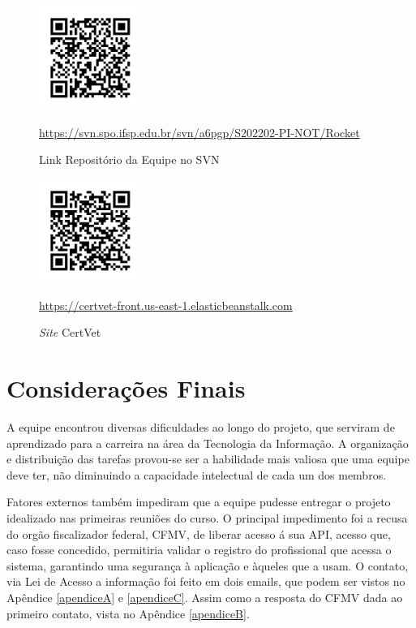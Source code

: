 \documentclass[
    12pt,               %
    openright,          %
    oneside,
    a4paper,            %
    BIBLATEX,           %
    TODO,               %
    english,            %
    brazil              %
    ]{ifsp-spo-inf-ctds}
\begin{document}
    \begin{figure}[htb!]
        \centering
        \includegraphics[width=0.3\textwidth]{qrcode/svn.png}
        \caption{Link Repositório da Equipe no SVN}
        {\footnotesize \url{https://svn.spo.ifsp.edu.br/svn/a6pgp/S202202-PI-NOT/Rocket}}
        \label{fig:svn}
    \end{figure}

   
    \begin{figure}[htb!]
         \centering
         \includegraphics[width=0.3\textwidth]{qrcode/qrcode_SITE.png}
         \caption{\emph{Site} CertVet}
         {\footnotesize \url{https://certvet-front.us-east-1.elasticbeanstalk.com}}
         \label{fig:linksite}
    \end{figure}   


\chapter[Considerações Finais]{Considerações Finais}

    A equipe encontrou diversas dificuldades ao longo do projeto, que serviram de aprendizado para a carreira na área da Tecnologia da Informação.
    A organização e distribuição das tarefas provou-se ser a habilidade mais valiosa que uma equipe deve ter, não diminuindo a capacidade intelectual de cada um dos membros. 

    Fatores externos também impediram que a equipe pudesse entregar o projeto idealizado nas primeiras reuniões do curso. O principal impedimento foi a recusa do orgão fiscalizador federal, CFMV, de liberar acesso á sua API, acesso que, caso fosse concedido, permitiria validar o registro do profissional que acessa o sistema, garantindo uma segurança à aplicação e àqueles que a usam. O contato, via Lei de Acesso a informação foi feito em dois emails, que podem ser vistos no Apêndice \ref{apendiceA}  e \ref{apendiceC}. Assim como a resposta do CFMV dada ao primeiro contato, vista no Apêndice \ref{apendiceB}.
\end{document}

